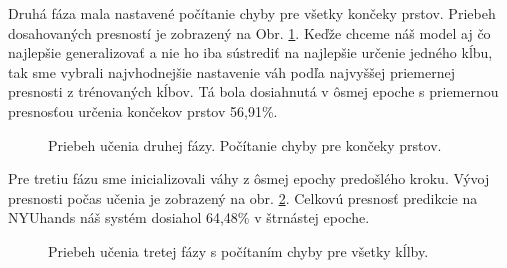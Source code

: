 Druhá fáza mala nastavené počítanie chyby pre všetky končeky prstov. Priebeh dosahovaných presností je zobrazený na Obr. \ref{img:51fingertipsAcc}. Keďže chceme náš model aj čo najlepšie generalizovať a nie ho iba sústrediť na najlepšie určenie jedného kĺbu, tak sme vybrali najvhodnejšie nastavenie váh podľa najvyššej priemernej presnosti z trénovaných kĺbov. Tá bola dosiahnutá v ôsmej epoche s priemernou presnosťou určenia končekov prstov 56,91\%.

\begin{figure}[H]
	\begin{center}
		\caption{Priebeh učenia druhej fázy. Počítanie chyby pre končeky prstov.}
		\label{img:51fingertipsAcc}
	\end{center}
\end{figure}

Pre tretiu fázu sme inicializovali váhy z ôsmej epochy predošlého kroku. Vývoj presnosti počas učenia je zobrazený na obr. \ref{img:52jointsAcc}. Celkovú presnosť predikcie na NYUhands náš systém dosiahol 64,48\% v štrnástej epoche.

\begin{figure}[H]
	\begin{center}
		\caption{Priebeh učenia tretej fázy s počítaním chyby pre všetky kĺlby.}
		\label{img:52jointsAcc}
	\end{center}
\end{figure}

